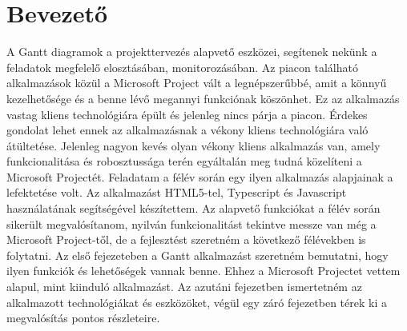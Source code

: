 \chapter*{Bevezető}

\hspace{2mm} A Gantt diagramok a projekttervezés alapvető eszközei, segítenek nekünk a feladatok megfelelő elosztásában, monitorozásában. Az piacon található alkalmazások közül a Microsoft Project vált a legnépszerűbbé, amit a könnyű kezelhetősége és a benne lévő megannyi funkciónak köszönhet. Ez az alkalmazás vastag kliens technológiára épült és jelenleg nincs párja a piacon. Érdekes gondolat lehet ennek az alkalmazásnak a vékony kliens technológiára való átültetése. Jelenleg nagyon kevés olyan vékony kliens alkalmazás van, amely funkcionalitása és robosztussága terén egyáltalán meg tudná közelíteni a Microsoft Projectét. Feladatam a félév során egy ilyen alkalmazás alapjainak a lefektetése volt. Az alkalmazást HTML5-tel, Typescript és Javascript használatának segítségével készítettem.\newline
\indent Az alapvető funkciókat a félév során sikerült megvalósítanom, nyilván funkcionalitást tekintve messze van még a Microsoft Project-től, de a fejlesztést szeretném a következő félévekben is folytatni. Az első fejezeteben a Gantt alkalmazást szeretném bemutatni, hogy ilyen funkciók és lehetőségek vannak benne. Ehhez a Microsoft Projectet vettem alapul, mint kiinduló alkalmazást. Az azutáni fejezetben ismertetném az alkalmazott technológiákat és eszközöket, végül egy záró fejezetben térek ki a megvalósítás pontos részleteire.